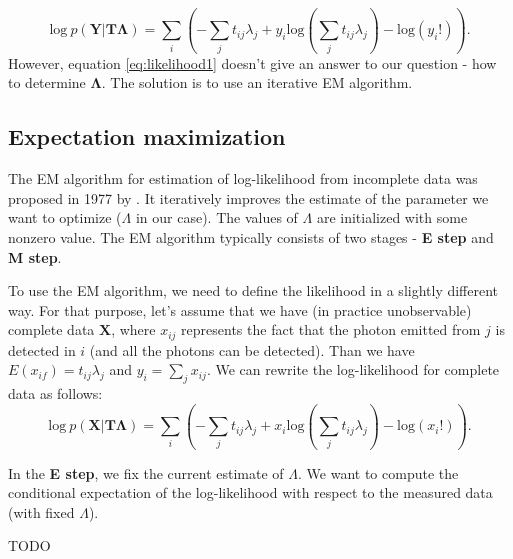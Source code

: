 \begin{equation}  
  \mathrm{log}\ p(\mathbf{Y} | \mathbf{T\Lambda} ) = \sum_{i}\left ( -\sum_{j} t_{ij}\lambda_{j} + y_{i} \mathrm{log}(\sum_{j} t_{ij}\lambda_{j})  - \mathrm{log}(y_{i}!) \right ).
  \label{eq:likelihood1}
\end{equation}
However, equation \ref{eq:likelihood1} doesn't give an answer to our question - how to determine $\mathbf{\Lambda}$. The solution is to use an iterative EM algorithm.

\subsection{Expectation maximization}
The EM algorithm for estimation of log-likelihood from incomplete data was proposed in 1977 by \cite{EM}.
It iteratively improves the estimate of the parameter we want to optimize ($\Lambda$ in our case).
The values of $\Lambda$ are initialized with some nonzero value.
The EM algorithm typically consists of two stages - \textbf{E step} and \textbf{M step}.

To use the EM algorithm, we need to define the likelihood in a slightly different way.
For that purpose, let's assume that we have (in practice unobservable) complete data $\mathbf{X}$, where $x_{ij}$ represents the fact that the photon emitted from $j$ is detected in $i$ (and all the photons can be detected).
Than we have $E(x_{if}) = t_{ij}\lambda_{j}$ and $y_{i} = \sum_{j}x_{ij}$. 
We can rewrite the log-likelihood for complete data as follows:
\begin{equation}  
  \mathrm{log}\ p(\mathbf{X} | \mathbf{T\Lambda} ) = \sum_{i}\left ( -\sum_{j} t_{ij}\lambda_{j} + x_{i} \mathrm{log}(\sum_{j} t_{ij}\lambda_{j})  - \mathrm{log}(x_{i}!) \right ).
  \label{eq:likelihood2}
\end{equation}

In the \textbf{E step}, we fix the current estimate of $\Lambda$. 
We want to compute the conditional expectation of the log-likelihood with respect to the measured data (with fixed $\Lambda$).

TODO

